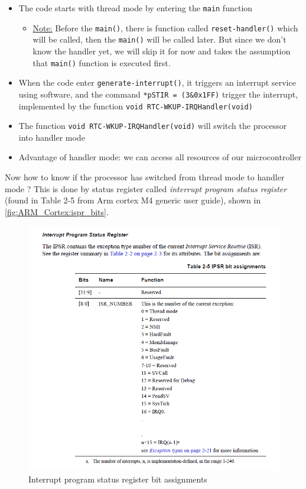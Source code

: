 \begin{itemize}
    
    \item The code starts with thread mode by entering the \verb|main| function

    \begin{itemize}
        \item \underline{Note:} Before the \verb|main()|, there is function called \verb|reset-handler()| which will be called, then the \verb|main()| will be called later. But since we don't know the handler yet, we will skip it for now and takes the assumption that \verb|main()| function is executed first.
    \end{itemize}

    \item When the code enter \verb|generate-interrupt()|, it triggers an interrupt service using software, and the command \verb|*pSTIR = (3&0x1FF)| trigger the interrupt, implemented by the function \verb|void RTC-WKUP-IRQHandler(void)| 


    \item The function  \verb|void RTC-WKUP-IRQHandler(void)|  will switch the processor into handler mode

    \item Advantage of handler mode: we can access all resources of our microcontroller
    
\end{itemize}

Now how to know if the processor has switched from thread mode to handler mode ? This is done by status register called  \textit{interrupt program status register} (found in Table 2-5 from Arm cortex M4 generic user guide), shown in \autoref{fig:ARM_Cortex:ispr_bits}.

\begin{figure}[h]
\centering
\includegraphics[scale=0.7]{Figures/ARM_Cortex/ispr_bits}
\caption{Interrupt program status register bit assignments}
\label{fig:ARM_Cortex:ispr_bits}
\end{figure}

